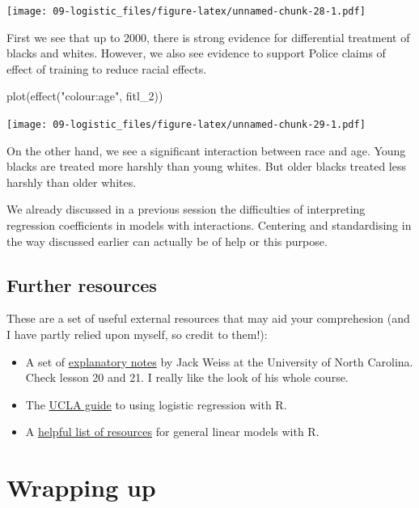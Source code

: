 \documentclass[
]{book}
\newenvironment{Shaded}{\begin{snugshade}}{\end{snugshade}}
\newcommand{\FunctionTok}[1]{\textcolor[rgb]{0.00,0.00,0.00}{#1}}
\newcommand{\NormalTok}[1]{#1}
\newcommand{\StringTok}[1]{\textcolor[rgb]{0.31,0.60,0.02}{#1}}
\begin{document}
\texttt{[image: 09-logistic\_files/figure-latex/unnamed-chunk-28-1.pdf]}

First we see that up to 2000, there is strong evidence for differential treatment of blacks and whites. However, we also see evidence to support Police claims of effect of training to reduce racial effects.

\begin{Shaded}
\begin{Highlighting}[]
\FunctionTok{plot}\NormalTok{(}\FunctionTok{effect}\NormalTok{(}\StringTok{"colour:age"}\NormalTok{, fitl\_2))}
\end{Highlighting}
\end{Shaded}

\texttt{[image: 09-logistic\_files/figure-latex/unnamed-chunk-29-1.pdf]}

On the other hand, we see a significant interaction between race and age. Young blacks are treated more harshly than young whites. But older blacks treated less harshly than older whites.

We already discussed in a previous session the difficulties of interpreting regression coefficients in models with interactions. Centering and standardising in the way discussed earlier can actually be of help or this purpose.

\hypertarget{further-resources-2}{%
\section{Further resources}\label{further-resources-2}}

These are a set of useful external resources that may aid your comprehesion (and I have partly relied upon myself, so credit to them!):

\begin{itemize}
\item
  A set of \href{http://www.unc.edu/courses/2010fall/ecol/563/001/docs/lectures/lecture20.htm\#dealing}{explanatory notes} by Jack Weiss at the University of North Carolina. Check lesson 20 and 21. I really like the look of his whole course.
\item
  The \href{http://www.ats.ucla.edu/stat/r/dae/logit.htm}{UCLA guide} to using logistic regression with R.
\item
  A \href{http://www.r-bloggers.com/some-r-resources-for-glms/}{helpful list of resources} for general linear models with R.
\end{itemize}

\hypertarget{wrapping-up}{%
\chapter{Wrapping up}\label{wrapping-up}}
\end{document}
